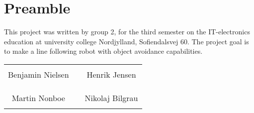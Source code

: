 \chapter*{Preamble}


This project was written by group 2, for the third semester on the IT-electronics education at university college Nordjylland, Sofiendalsvej 60. The project goal is to make a line following robot with object avoidance capabilities.
%
\phantom{Luft}\vspace{3cm}
\begin{table}[H]
	\centering
		\begin{tabular}{c c c}
			\underline{\phantom{JAERJAERJAERJAERGO}} & \phantom{cookies} & \underline{\phantom{JAERJAERJAERJAERGO}} \\
			Benjamin Nielsen			& \phantom{cookies} & Henrik Jensen		\\
			&&\\
			&&\\
			\underline{\phantom{JAERJAERJAERJAERGO}} & \phantom{cookies} & \underline{\phantom{JAERJAERJAERJAERGO}} \\
			Martin Nonboe			& \phantom{cookies} & Nikolaj Bilgrau		\\
			&&\\
						
		\end{tabular}
\end{table}